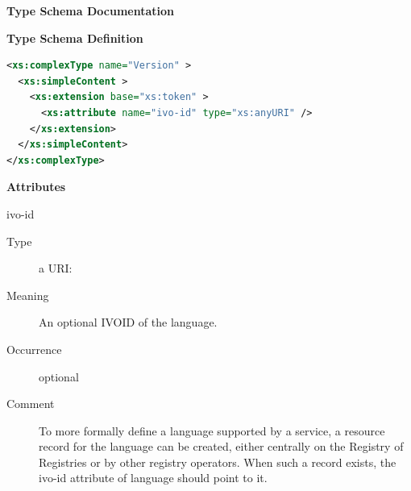 \documentclass{ivoa}
\begin{document}
\endgroup

\begingroup
      	\renewcommand*\descriptionlabel[1]{%
      	\hbox to 5.5em{\emph{#1}\hfil}}
      	\vspace{2ex}\noindent\textbf{ Type Schema Documentation}



\vspace{1ex}\noindent\textbf{ Type Schema Definition}

\begin{lstlisting}[language=XML,basicstyle=\footnotesize]
<xs:complexType name="Version" >
  <xs:simpleContent >
    <xs:extension base="xs:token" >
      <xs:attribute name="ivo-id" type="xs:anyURI" />
    </xs:extension>
  </xs:simpleContent>
</xs:complexType>
\end{lstlisting}

\vspace{0.5ex}\noindent\textbf{ Attributes}

\begingroup\small\begin{bigdescription}
\item[ivo-id]
\begin{description}
\item[Type] a URI: 
\item[Meaning] 
            An optional IVOID of the language.
            
\item[Occurrence] optional
\item[Comment] 
              To more formally define a language supported by a service,
              a resource record for the language can be created, either
              centrally on the Registry of Registries or by other registry operators.  
              When such a record exists, the ivo-id attribute of language
              should point to it.
            
\end{description}


\end{bigdescription}\endgroup
\end{document}
